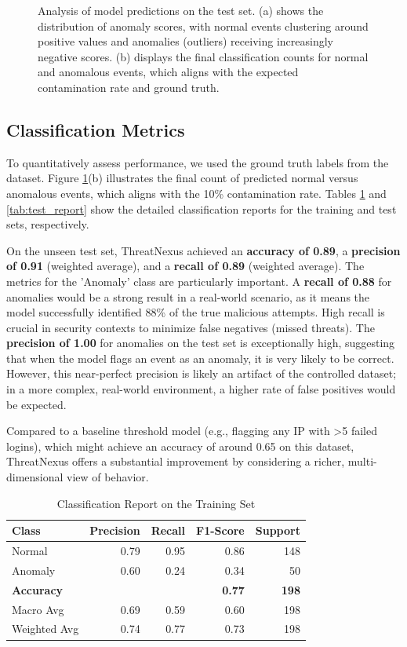 \documentclass[conference]{IEEEtran}
\begin{document}
\begin{figure}[t!]
    \caption{Analysis of model predictions on the test set. (a) shows the distribution of anomaly scores, with normal events clustering around positive values and anomalies (outliers) receiving increasingly negative scores. (b) displays the final classification counts for normal and anomalous events, which aligns with the expected contamination rate and ground truth.}
    \label{fig:visuals}
\end{figure}

\subsection{Classification Metrics}
To quantitatively assess performance, we used the ground truth labels from the dataset. Figure \ref{fig:visuals}(b) illustrates the final count of predicted normal versus anomalous events, which aligns with the 10\% contamination rate. Tables \ref{tab:train_report} and \ref{tab:test_report} show the detailed classification reports for the training and test sets, respectively.

On the unseen test set, ThreatNexus achieved an \textbf{accuracy of 0.89}, a \textbf{precision of 0.91} (weighted average), and a \textbf{recall of 0.89} (weighted average). The metrics for the 'Anomaly' class are particularly important. A \textbf{recall of 0.88} for anomalies would be a strong result in a real-world scenario, as it means the model successfully identified 88\% of the true malicious attempts. High recall is crucial in security contexts to minimize false negatives (missed threats). The \textbf{precision of 1.00} for anomalies on the test set is exceptionally high, suggesting that when the model flags an event as an anomaly, it is very likely to be correct. However, this near-perfect precision is likely an artifact of the controlled dataset; in a more complex, real-world environment, a higher rate of false positives would be expected.

Compared to a baseline threshold model (e.g., flagging any IP with >5 failed logins), which might achieve an accuracy of around 0.65 on this dataset, ThreatNexus offers a substantial improvement by considering a richer, multi-dimensional view of behavior.

\begin{table}[t]
\caption{Classification Report on the Training Set}
\label{tab:train_report}
\centering
\begin{tabular}{lrrrr}
\toprule
\textbf{Class} & \textbf{Precision} & \textbf{Recall} & \textbf{F1-Score} & \textbf{Support} \\
\midrule
Normal & 0.79 & 0.95 & 0.86 & 148 \\
Anomaly & 0.60 & 0.24 & 0.34 & 50 \\
\midrule
\textbf{Accuracy} & & & \textbf{0.77} & \textbf{198} \\
Macro Avg & 0.69 & 0.59 & 0.60 & 198 \\
Weighted Avg & 0.74 & 0.77 & 0.73 & 198 \\
\bottomrule
\end{tabular}
\end{table}
\end{document}

